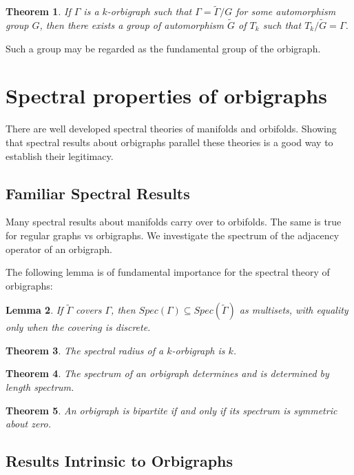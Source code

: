 \documentclass[12pt]{article}
\theoremstyle{plain}
\newtheorem{theorem}{Theorem}
\newtheorem{lemma}[theorem]{Lemma}
\theoremstyle{definition}
\theoremstyle{remark}
\begin{document}
\begin{theorem}
If $\Gamma$ is a $k$-orbigraph such that $\Gamma = \widetilde{\Gamma}/G$ for some automorphism group $G$, then there exists a group of automorphism $\widetilde{G}$ of $T_k$ such that $T_k / \widetilde{G} = \Gamma$.
\end{theorem}

Such a group may be regarded as the fundamental group of the orbigraph.

\section{Spectral properties of orbigraphs}

There are well developed spectral theories of manifolds and orbifolds. Showing that spectral results about orbigraphs parallel these theories is a good way to establish their legitimacy.

\subsection{Familiar Spectral Results}

Many spectral results about manifolds carry over to orbifolds. The same is true for regular graphs vs orbigraphs. We investigate the spectrum of the adjacency operator of an orbigraph.

The following lemma is of fundamental importance for the spectral theory of orbigraphs:

\begin{lemma}
If $\widetilde{\Gamma}$ covers $\Gamma$, then $Spec(\Gamma) \subseteq Spec(\widetilde{\Gamma})$ as multisets, with equality only when the covering is discrete.
\end{lemma}

\begin{theorem}
The spectral radius of a $k$-orbigraph is $k$.
\end{theorem}

\begin{theorem}
The spectrum of an orbigraph determines and is determined by length spectrum.
\end{theorem}

\begin{theorem}
An orbigraph is bipartite if and only if its spectrum is symmetric about zero.
\end{theorem}


\subsection{Results Intrinsic to Orbigraphs}
\end{document}
